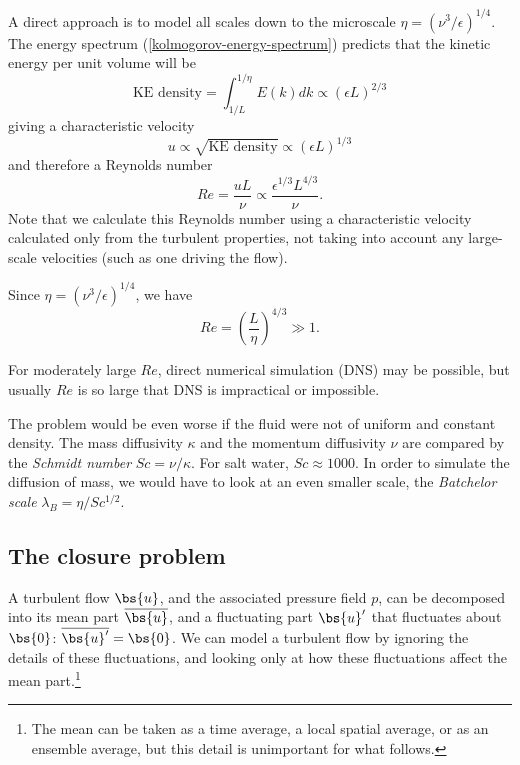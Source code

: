 A direct approach is to model all scales down to the microscale
$\eta=(\nu^3/\epsilon)^{1/4}$. The energy spectrum
(\ref{kolmogorov-energy-spectrum}) predicts that the kinetic energy 
per unit volume will be 
\begin{equation}
    \text{KE density} = \int_{1/L}^{1/\eta} E(k) dk \propto (\epsilon L)^{2/3}
\end{equation}
giving a characteristic velocity
\begin{equation}
    u \propto \sqrt{\text{KE density}} \propto (\epsilon L)^{1/3}
\end{equation}
and therefore a Reynolds number
\begin{equation}
    Re = \frac{uL}{\nu} \propto \frac{\epsilon^{1/3} L^{4/3}}{\nu}.
\end{equation}
Note that we calculate this Reynolds number using a characteristic velocity
calculated only from the turbulent properties, not taking into account any
large-scale velocities (such as one driving the flow). 

Since $\eta = (\nu^3/\epsilon)^{1/4}$, we have
\begin{equation}
    Re = \left(\frac{L}{\eta}\right)^{4/3} \gg 1.
\end{equation}

For moderately large $Re$, direct numerical simulation (DNS) may be possible,
but usually $Re$ is so large that DNS is impractical or impossible. 

The problem would be even worse if the fluid were not of uniform and constant
density. The mass diffusivity $\kappa$ and the momentum diffusivity $\nu$ are
compared by the \textit{Schmidt number} $Sc = \nu/\kappa$. For salt water, $Sc
\approx 1000$. In order to simulate the diffusion of mass, we would have to look
at an even smaller scale, the \textit{Batchelor scale}
$\lambda_B=\eta/Sc^{1/2}$. 

\subsection{The closure problem}

A turbulent flow $\bs{u}$, and the associated pressure field $p$, can be decomposed into its mean part $\overline{\bs{u}}$, and a fluctuating part $\bs{u}'$ that fluctuates about $\bs{0}$: $\overline{\bs{u}'} = \bs{0}$. We can model a turbulent flow by ignoring the details of these fluctuations, and looking only at how these fluctuations affect the mean part.\footnote{The mean can be taken as a time average, a local spatial average, or as an ensemble average, but this detail is unimportant for what follows.}

